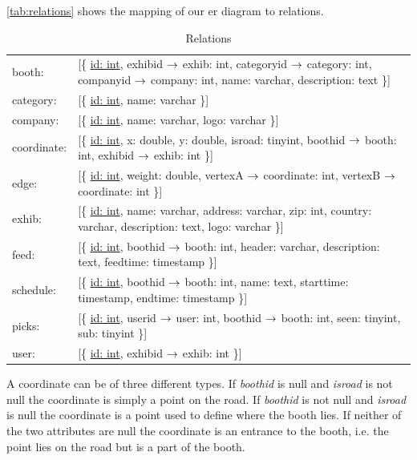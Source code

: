 \autoref{tab:relations} shows the mapping of our \ac{er} diagram to relations.

\newcommand{\relation}[1]{[\{ #1 \}]\\}

\begin{table}[H]
\centering
\small
\begin{tabular}{p{1.2cm} p{9.6cm}}
booth: & \relation{\underline{id: int}, exhibid $\rightarrow$ exhib: int, categoryid $\rightarrow$ category: int, companyid $\rightarrow$ company: int, name: varchar, description: text}
category: & \relation{\underline{id: int}, name: varchar}
company: & \relation{\underline{id: int}, name: varchar, logo: varchar}
coordinate: & \relation{\underline{id: int}, x: double, y: double, isroad: tinyint, boothid $\rightarrow$ booth: int, exhibid $\rightarrow$ exhib: int}
edge: & \relation{\underline{id: int}, weight: double, vertexA $\rightarrow$ coordinate: int, vertexB $\rightarrow$ coordinate: int}
exhib: & \relation{\underline{id: int}, name: varchar, address: varchar, zip: int, country: varchar, description: text, logo: varchar}
feed: & \relation{\underline{id: int}, boothid $\rightarrow$ booth: int, header: varchar, description: text, feedtime: timestamp}
schedule: & \relation{\underline{id: int}, boothid $\rightarrow$ booth: int, name: text, starttime: timestamp, endtime: timestamp}
picks: & \relation{\underline{id: int}, userid $\rightarrow$ user: int, boothid $\rightarrow$ booth: int, seen: tinyint, sub: tinyint}
user: & \relation{\underline{id: int}, exhibid $\rightarrow$ exhib: int}
\end{tabular}
\caption{Relations}
\label{tab:relations}
\end{table}
A coordinate can be of three different types. If \textit{boothid} is null and \textit{isroad} is not null the coordinate is simply a point on the road. If \textit{boothid} is not null and \textit{isroad} is null the coordinate is a point used to define where the booth lies. If neither of the two attributes are null the coordinate is an entrance to the booth, i.e. the point lies on the road but is a part of the booth.
